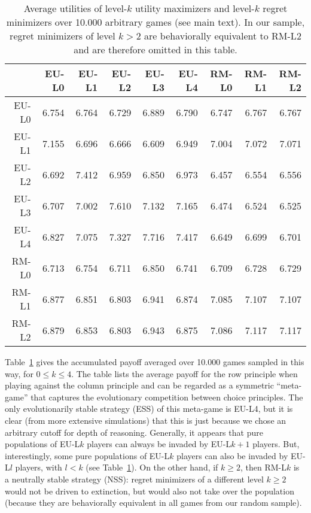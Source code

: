 \documentclass[10pt]{article}
\begin{document}
\begin{table}
  \centering
\begin{tabular}{rrrrrrrrr}
  \hline
 & EU-L0 & EU-L1 & EU-L2 & EU-L3 & EU-L4 & RM-L0 & RM-L1 & RM-L2 \\ 
  \hline
  EU-L0 & 6.754 & 6.764 & 6.729 & 6.889 & 6.790 & 6.747 & 6.767 & 6.767  \\ 
  EU-L1 & 7.155 & 6.696 & 6.666 & 6.609 & 6.949 & 7.004 & 7.072 & 7.071  \\ 
  EU-L2 & 6.692 & 7.412 & 6.959 & 6.850 & 6.973 & 6.457 & 6.554 & 6.556  \\ 
  EU-L3 & 6.707 & 7.002 & 7.610 & 7.132 & 7.165 & 6.474 & 6.524 & 6.525  \\ 
  EU-L4 & 6.827 & 7.075 & 7.327 & 7.716 & 7.417 & 6.649 & 6.699 & 6.701  \\ 
  RM-L0 & 6.713 & 6.754 & 6.711 & 6.850 & 6.741 & 6.709 & 6.728 & 6.729  \\ 
  RM-L1 & 6.877 & 6.851 & 6.803 & 6.941 & 6.874 & 7.085 & 7.107 & 7.107  \\ 
  RM-L2 & 6.879 & 6.853 & 6.803 & 6.943 & 6.875 & 7.086 & 7.117 & 7.117  \\ 
   \hline
\end{tabular}
\caption{Average utilities of level-$k$ utility maximizers and
  level-$k$ regret minimizers over 10.000 arbitrary games (see main
  text). In our sample, regret minimizers of level $k>2$ are
  behaviorally equivalent to RM-L$2$ and are therefore omitted in this table. } 
  \label{tab:MaxUtil}
\end{table}
 
Table~\ref{tab:MaxUtil} gives the accumulated payoff averaged over
10.000 games sampled in this way, for $0 \le k \le 4$. The table lists
the average payoff for the row principle when playing against the
column principle and can be regarded as a symmetric ``meta-game'' that
captures the evolutionary competition between choice principles. The
only evolutionarily stable strategy (ESS) of this meta-game is EU-L4,
but it is clear (from more extensive simulations) that this is just
because we chose an arbitrary cutoff for depth of
reasoning. Generally, it appears that pure populations of EU-L$k$
players can always be invaded by EU-L$k+1$ players. But,
interestingly, some pure populations of EU-L$k$ players can also be
invaded by EU-L$l$ players, with $l<k$ (see
Table~\ref{tab:MaxUtil}). On the other hand, if $k\ge2$, then RM-L$k$
is a neutrally stable strategy (NSS): regret minimizers of a different
level $k\ge2$ would not be driven to extinction, but would also not
take over the population (because they are behaviorally equivalent in
all games from our random sample).
\end{document}
